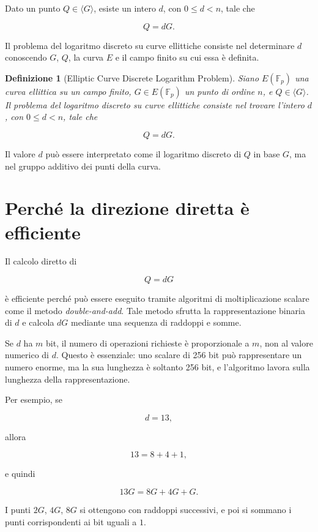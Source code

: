 \documentclass[12pt,a4paper,oneside]{report}
\newtheorem{definition}{Definizione}[chapter]
\begin{document}
Dato un punto \(Q \in \langle G \rangle\), esiste un intero \(d\), con \(0 \leq d < n\), tale che

\begin{equation}
    Q = dG.
\end{equation}

Il problema del logaritmo discreto su curve ellittiche consiste nel determinare \(d\) conoscendo \(G\), \(Q\), la curva \(E\) e il campo finito su cui essa è definita.

\begin{definition}[Elliptic Curve Discrete Logarithm Problem]
Siano \(E(\mathbb{F}_p)\) una curva ellittica su un campo finito, \(G\in E(\mathbb{F}_p)\) un punto di ordine \(n\), e \(Q\in \langle G\rangle\). Il problema del logaritmo discreto su curve ellittiche consiste nel trovare l'intero \(d\), con \(0 \leq d < n\), tale che

\[
Q=dG.
\]
\end{definition}

Il valore \(d\) può essere interpretato come il logaritmo discreto di \(Q\) in base \(G\), ma nel gruppo additivo dei punti della curva.

\section{Perché la direzione diretta è efficiente}

Il calcolo diretto di

\[
Q=dG
\]

è efficiente perché può essere eseguito tramite algoritmi di moltiplicazione scalare come il metodo \textit{double-and-add}. Tale metodo sfrutta la rappresentazione binaria di \(d\) e calcola \(dG\) mediante una sequenza di raddoppi e somme.

Se \(d\) ha \(m\) bit, il numero di operazioni richieste è proporzionale a \(m\), non al valore numerico di \(d\). Questo è essenziale: uno scalare di 256 bit può rappresentare un numero enorme, ma la sua lunghezza è soltanto 256 bit, e l'algoritmo lavora sulla lunghezza della rappresentazione.

Per esempio, se

\[
d = 13,
\]

allora

\[
13 = 8+4+1,
\]

e quindi

\[
13G = 8G + 4G + G.
\]

I punti \(2G\), \(4G\), \(8G\) si ottengono con raddoppi successivi, e poi si sommano i punti corrispondenti ai bit uguali a \(1\).
\end{document}
